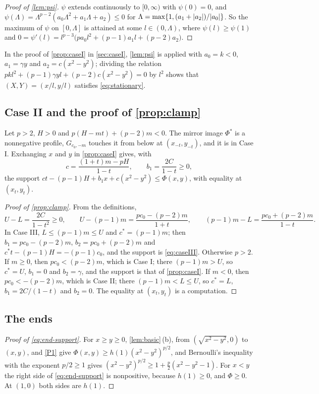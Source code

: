 \begin{proof}[Proof of \cref{lem:psi}]
$\psi$ extends continuously to $[0,\infty)$ with $\psi(0)=0$, and
$\psi(\Lambda)=\Lambda^{p-2}(a_0\Lambda^2+a_1\Lambda+a_2)\le0$ for
$\Lambda=\max\{1,(a_1+\lvert a_2\rvert)/\lvert a_0\rvert\}$. So the maximum of $\psi$ on $[0,\Lambda]$ is
attained at some $l\in(0,\Lambda)$, where $\psi(l)\ge\psi(1)$ and
$0=\psi'(l)=l^{p-3}\bigl(pa_0l^2+(p-1)a_1l+(p-2)a_2\bigr)$.
\end{proof}

In the proof of \cref{prop:caseI} in \cref{sec:caseI}, \cref{lem:psi} is applied with
$a_0=k<0$, $a_1=\gamma y$ and $a_2=c(x^2-y^2)$; dividing the relation
$pkl^2+(p-1)\gamma yl+(p-2)c(x^2-y^2)=0$ by $l^2$ shows that $(X,Y)=(x/l,y/l)$ satisfies
\eqref{eq:stationary}.

\subsection{Case II and the proof of \cref{prop:clamp}}

Let $p>2$, $H>0$ and $p(H-mt)+(p-2)m<0$. The mirror image $\Phi^\ast$ is a nonnegative profile,
$G_{c_0,-m}$ touches it from below at $(x_{-t},y_{-t})$, and it is in Case I. Exchanging $x$
and $y$ in \cref{prop:caseI} gives, with
\[
  c=\frac{(1+t)m-pH}{1-t},\qquad b_1=\frac{2C}{1-t}\ge0,
\]
the support $ct-(p-1)H+b_1x+c(x^2-y^2)\le\Phi(x,y)$, with equality at $(x_t,y_t)$.

\begin{proof}[Proof of \cref{prop:clamp}]
From the definitions,
\[
  U-L=\frac{2C}{1-t^2}\ge0,\qquad U-(p-1)m=\frac{pc_0-(p-2)m}{1+t},\qquad
  (p-1)m-L=\frac{pc_0+(p-2)m}{1-t}.
\]
In Case III, $L\le(p-1)m\le U$ and $c^\ast=(p-1)m$; then $b_1=pc_0-(p-2)m$,
$b_2=pc_0+(p-2)m$ and $c^\ast t-(p-1)H=-(p-1)c_0$, and the support is \eqref{eq:caseIII}.
Otherwise $p>2$. If $m\ge0$, then $pc_0<(p-2)m$, which is Case I; there $(p-1)m>U$, so
$c^\ast=U$, $b_1=0$ and $b_2=\gamma$, and the support is that of \cref{prop:caseI}. If $m<0$,
then $pc_0<-(p-2)m$, which is Case II; there $(p-1)m<L\le U$, so $c^\ast=L$, $b_1=2C/(1-t)$ and
$b_2=0$. The equality at $(x_t,y_t)$ is a computation.
\end{proof}

\subsection{The ends}

\begin{proof}[Proof of \eqref{eq:end-support}]
For $x\ge y\ge0$, \cref{lem:basic}\,(b), from $(\sqrt{x^2-y^2},0)$ to $(x,y)$, and \ref{P1} give
$\Phi(x,y)\ge h(1)(x^2-y^2)^{p/2}$, and Bernoulli's inequality with the exponent $p/2\ge1$ gives
$(x^2-y^2)^{p/2}\ge1+\tfrac p2(x^2-y^2-1)$. For $x<y$ the right side of \eqref{eq:end-support}
is nonpositive, because $h(1)\ge0$, and $\Phi\ge0$. At $(1,0)$ both sides are $h(1)$.
\end{proof}

